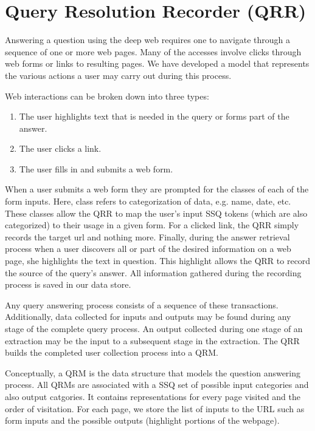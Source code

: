 \section{Query Resolution Recorder (QRR)}
\label{sec:qrr}
Answering a question using the deep web requires one to navigate
through a sequence of one or more web pages. Many of the accesses involve clicks through web forms or links to resulting pages.  We have developed a model that represents the various actions a user may carry out during this process.

Web interactions can be broken down into three types:
\begin{enumerate}
\item The user highlights text that is needed in the query or forms part of the answer.
\item The user clicks a link.
\item The user fills in and submits a web form. 
\end{enumerate}

When a user submits a web form they are prompted for the classes of each of the form inputs. Here, class refers to categorization of data, e.g. name, date, etc. These classes allow the QRR to map the user's input SSQ tokens (which are also categorized) to their usage in a given form. For a clicked link, the QRR simply records the target url and nothing more. Finally, during the answer retrieval process when a user discovers all or part of the desired information on a web page, she highlights the text in question. This highlight allows the QRR to record the source of the query's answer. All information gathered during the recording process is saved in our data store. 

Any query answering process consists of a sequence of these transactions.
Additionally, data collected for inputs and outputs may be found
during any stage of the complete query process.  An output
collected during one stage of an extraction may be the input to a
subsequent stage in the extraction.  The QRR builds the completed user
collection process into a QRM.  

Conceptually, a QRM is the data structure that models the question answering process.  All QRMs are associated with a SSQ set of possible input categories and also output catgories.  It contains representations for every page visited and the order of visitation.  For each page, we store the list of inputs to the URL such as form inputs and the possible outputs (highlight portions of the webpage).


